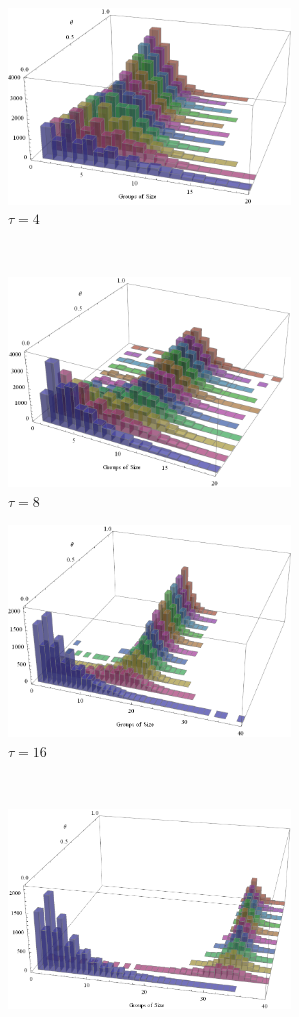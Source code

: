\documentclass{TeXstyles/DARS/svmult}  %
\begin{document}
\begin{figure}[!htb]
\begin{subfigure}{0.5\textwidth}
\centering\includegraphics[width=7.5cm]{figures/collabratesweep4.png}
\centering\caption{$\tau = 4$}\label{fig:collabsweep4}
\end{subfigure}~
\begin{subfigure}{0.5\textwidth}
\centering\includegraphics[width=7.5cm]{figures/collabratesweep8.png}
\centering\caption{$\tau = 8$}\label{fig:collabsweep8}
\end{subfigure}
\begin{subfigure}{0.5\textwidth}
\centering\includegraphics[width=7.5cm]{figures/collabratesweep16.png}
\centering\caption{$\tau = 16$}\label{fig:collabsweep16}
\end{subfigure}~
\begin{subfigure}{0.5\textwidth}
\centering\includegraphics[width=7.5cm]{figures/collabratesweep32.png}

\end{subfigure}
\end{figure}
\end{document}
